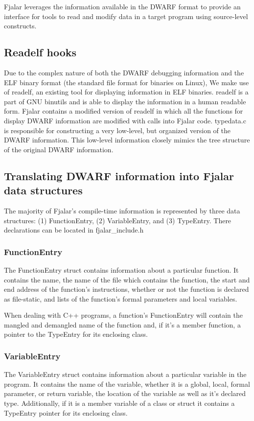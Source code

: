 \documentclass[11pt]{article}
\begin{document}
Fjalar leverages the information available in the DWARF format to
provide an interface for tools to read and modify data in a target
program using source-level constructs.


\subsection{Readelf hooks}
Due to the complex nature of both the DWARF debugging information and
the ELF binary format (the standard file format for binaries on Linux),
We make use of readelf, an existing tool for displaying information in
ELF binaries. readelf is a part of GNU binutils and is able to display
the information in a human readable form. Fjalar contains a modified
version of readelf in which all the functions for display DWARF
information are modified with calls into Fjalar code. typedata.c is
responsible for constructing a very low-level, but organized version
of the DWARF information. This low-level information closely mimics
the tree structure of the original DWARF information.

\subsection{Translating DWARF information into Fjalar data structures}
The majority of Fjalar's compile-time information is represented by
three data structures: (1) FunctionEntry, (2) VariableEntry, and (3)
TypeEntry. There declarations can be located in fjalar\_include.h

\subsubsection{FunctionEntry}
The FunctionEntry struct contains information about a particular
function. It contains the name, the name of the file which  
contains the function, the start and end address of the function's 
instructions, whether or not the function is declared as file-static,
and lists of the function's formal parameters and local variables. 

When dealing with C++ programs, a function's FunctionEntry will  
contain the mangled and demangled name of the function and, if it's a
member function, a pointer to the TypeEntry for its enclosing class.

\subsubsection{VariableEntry}
The VariableEntry struct contains information about a particular
variable in the program. It contains the name of the variable, whether
it is a global, local, formal parameter, or return variable, the
location of the variable as well as it's declared type. Additionally,
if it is a member variable of a class or struct it contains a
TypeEntry pointer for its enclosing class.
\end{document}
